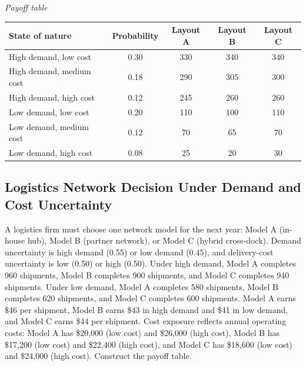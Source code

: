 \begin{ExamProblems}
\begin{center}
		\end{center}
		\begin{center}
			\textit{Payoff table} \\
			\begin{tabular}{l c c c c}
				\toprule
				State of nature & Probability & Layout A & Layout B & Layout C \\
				\midrule
				High demand, low cost & 0.30 & 330 & 340 & 340 \\
				High demand, medium cost & 0.18 & 290 & 305 & 300 \\
				High demand, high cost & 0.12 & 245 & 260 & 260 \\
				Low demand, low cost & 0.20 & 110 & 100 & 110 \\
				Low demand, medium cost & 0.12 & 70 & 65 & 70 \\
				Low demand, high cost & 0.08 & 25 & 20 & 30 \\
				\bottomrule
			\end{tabular}
		\end{center}
		
		\item
		\subsection*{Logistics Network Decision Under Demand and Cost Uncertainty}
		A logistics firm must choose one network model for the next year: Model A (in-house hub),
		Model B (partner network), or Model C (hybrid cross-dock). Demand uncertainty is high demand (0.55)
		or low demand (0.45), and delivery-cost uncertainty is low (0.50) or high (0.50).
		Under high demand, Model A completes 960 shipments, Model B completes 900 shipments, and Model C completes 940 shipments.
		Under low demand, Model A completes 580 shipments, Model B completes 620 shipments, and Model C completes 600 shipments.
		Model A earns \$46 per shipment, Model B earns \$43 in high demand and \$41 in low demand,
		and Model C earns \$44 per shipment. Cost exposure reflects annual operating costs:
		Model A has \$20{,}000 (low cost) and \$26{,}000 (high cost),
		Model B has \$17{,}200 (low cost) and \$22{,}400 (high cost), and
		Model C has \$18{,}600 (low cost) and \$24{,}000 (high cost).
		Construct the payoff table.
		

\end{ExamProblems}
